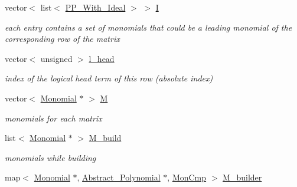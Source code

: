 \begin{DoxyCompactItemize}
\mbox{\label{group___g_b_computation_a1d3e35d9bf43d93ba740b6bd8f5237dd}} 
vector$<$ list$<$ \hyperlink{group___g_b_computation_class_dynamic___engine_1_1_p_p___with___ideal}{P\+P\+\_\+\+With\+\_\+\+Ideal} $>$ $>$ \hyperlink{group___g_b_computation_a1d3e35d9bf43d93ba740b6bd8f5237dd}{I}
\begin{DoxyCompactList}\small\item\em each entry contains a set of monomials that could be a leading monomial of the corresponding row of the matrix \end{DoxyCompactList}\item 
\mbox{\label{group___g_b_computation_a740d4262bc2b5fdfcf2bf23bf05bf866}} 
vector$<$ unsigned $>$ \hyperlink{group___g_b_computation_a740d4262bc2b5fdfcf2bf23bf05bf866}{l\+\_\+head}
\begin{DoxyCompactList}\small\item\em index of the logical head term of this row (absolute index) \end{DoxyCompactList}\item 
\mbox{\label{group___g_b_computation_a7dac72addf3ef8ff2c87c247a90eaa9d}} 
vector$<$ \hyperlink{group__polygroup_class_monomial}{Monomial} $\ast$ $>$ \hyperlink{group___g_b_computation_a7dac72addf3ef8ff2c87c247a90eaa9d}{M}
\begin{DoxyCompactList}\small\item\em monomials for each matrix \end{DoxyCompactList}\item 
\mbox{\label{group___g_b_computation_aee58b978a10b26bbdf1d518e6eb25fb5}} 
list$<$ \hyperlink{group__polygroup_class_monomial}{Monomial} $\ast$ $>$ \hyperlink{group___g_b_computation_aee58b978a10b26bbdf1d518e6eb25fb5}{M\+\_\+build}
\begin{DoxyCompactList}\small\item\em monomials while building \end{DoxyCompactList}\item 
\mbox{\label{group___g_b_computation_a8f8cacf3d9ae0458adfdb7e6184e7b3f}} 
map$<$ \hyperlink{group__polygroup_class_monomial}{Monomial} $\ast$, \hyperlink{group__polygroup_class_abstract___polynomial}{Abstract\+\_\+\+Polynomial} $\ast$, \hyperlink{struct_mon_cmp}{Mon\+Cmp} $>$ \hyperlink{group___g_b_computation_a8f8cacf3d9ae0458adfdb7e6184e7b3f}{M\+\_\+builder}

\end{DoxyCompactItemize}
